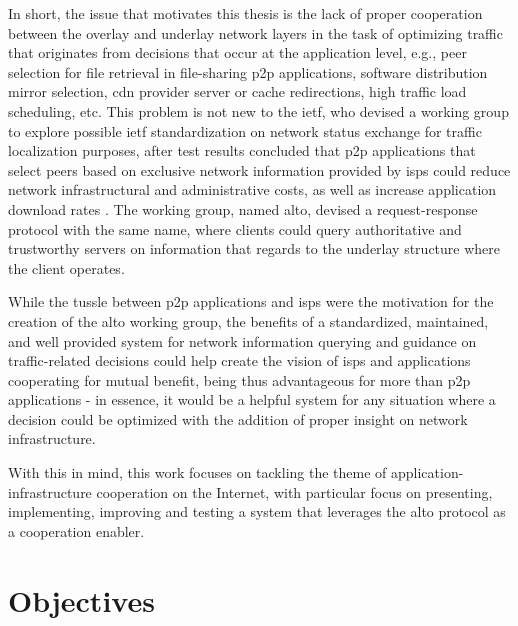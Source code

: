     In short, the issue that motivates this thesis is the lack of proper cooperation between the overlay and underlay network layers in the task of optimizing traffic that originates from decisions that occur at the application level, e.g., peer selection for file retrieval in file-sharing \gls{p2p} applications, software distribution mirror selection, \gls{cdn} provider server or cache redirections, high traffic load scheduling, etc.
    This problem is not new to the \gls{ietf}, who devised a working group to explore possible \gls{ietf} standardization on network status exchange for traffic localization purposes, after test results concluded that \gls{p2p} applications that select peers based on exclusive network information provided by \glspl{isp} could reduce network infrastructural and administrative costs, as well as increase application download rates \cite{seedorf2009}.
    The working group, named \gls{alto}, devised a request-response protocol with the same name, where clients could query authoritative and trustworthy servers on information that regards to the underlay structure where the client operates.

    While the tussle between \gls{p2p} applications and \glspl{isp} were the motivation for the creation of the \gls{alto} working group, the benefits of a standardized, maintained, and well provided system for network information querying and guidance on traffic-related decisions could help create the vision of \glspl{isp} and applications cooperating for mutual benefit, being thus advantageous for more than \gls{p2p} applications - in essence, it would be a helpful system for any situation where a decision could be optimized with the addition of proper insight on network infrastructure.

    With this in mind, this work focuses on tackling the theme of application-infrastructure cooperation on the Internet, with particular focus on presenting, implementing, improving and testing a system that leverages the \gls{alto} protocol as a cooperation enabler.

\section{Objectives}

